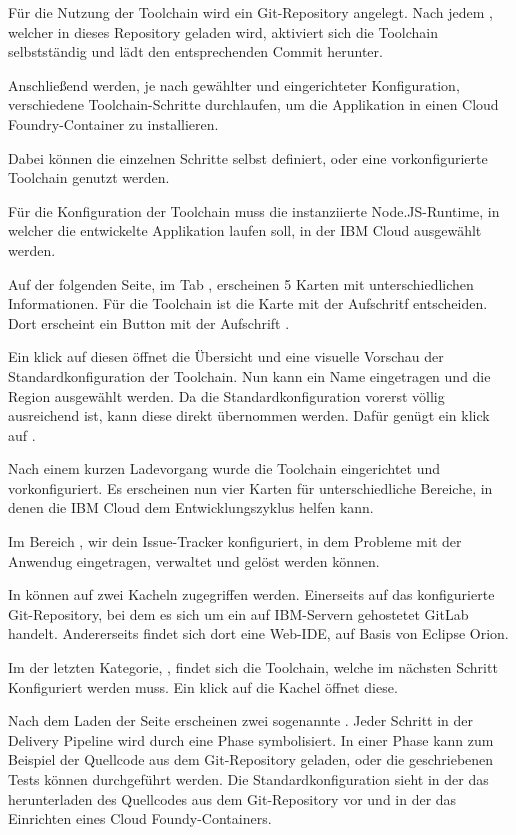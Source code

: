 Für die Nutzung der Toolchain wird ein Git-Repository angelegt. Nach jedem , welcher in dieses Repository
geladen wird, aktiviert sich die Toolchain selbstständig und lädt den entsprechenden Commit herunter.

Anschließend werden, je nach gewählter und eingerichteter Konfiguration, verschiedene Toolchain-Schritte durchlaufen, um
die Applikation in einen Cloud Foundry-Container zu installieren.

Dabei können die einzelnen Schritte selbst definiert, oder eine vorkonfigurierte Toolchain genutzt werden.

Für die Konfiguration der Toolchain muss die instanziierte Node.JS-Runtime, in welcher die entwickelte Applikation laufen
soll, in der IBM Cloud ausgewählt werden.

Auf der folgenden Seite, im Tab , erscheinen 5 Karten mit unterschiedlichen Informationen. Für die
Toolchain ist die Karte mit der Aufschritf  entscheiden. Dort erscheint ein Button mit der
Aufschrift .

Ein klick auf diesen öffnet die Übersicht und eine visuelle Vorschau der Standardkonfiguration der Toolchain. Nun kann ein
Name eingetragen und die Region ausgewählt werden. Da die Standardkonfiguration vorerst völlig ausreichend ist, kann diese
direkt übernommen werden. Dafür genügt ein klick auf .

Nach einem kurzen Ladevorgang wurde die Toolchain eingerichtet und vorkonfiguriert. Es erscheinen nun vier Karten für
unterschiedliche Bereiche, in denen die IBM Cloud dem Entwicklungszyklus helfen kann.

Im Bereich , wir dein Issue-Tracker konfiguriert, in dem Probleme mit der Anwendug eingetragen, verwaltet
und gelöst werden können.

In  können auf zwei Kacheln zugegriffen werden. Einerseits auf das konfigurierte Git-Repository, bei dem
es sich um ein auf IBM-Servern gehostetet GitLab handelt. Andererseits findet sich dort eine Web-IDE, auf Basis von
Eclipse Orion.

Im der letzten Kategorie, , findet sich die Toolchain, welche im nächsten Schritt Konfiguriert werden
muss. Ein klick auf die Kachel  öffnet diese.

Nach dem Laden der Seite erscheinen zwei sogenannte . Jeder Schritt in der Delivery Pipeline wird durch eine
Phase symbolisiert. In einer Phase kann zum Beispiel der Quellcode aus dem Git-Repository geladen, oder die
geschriebenen Tests können durchgeführt werden. Die Standardkonfiguration sieht in der  das herunterladen
des Quellcodes aus dem Git-Repository vor und in der  das Einrichten eines Cloud Foundy-Containers.

